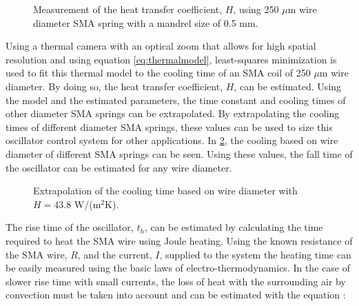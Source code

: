 \begin{figure}[ht] %
  \centering
  \resizebox{0.8\textwidth}{!}{}
  \caption{Measurement of the heat transfer coefficient, $H$, using 250 $\mu$m wire diameter SMA spring with a mandrel size of 0.5 mm.}
  \label{fig:thermal-fitting}
\end{figure}

Using a thermal camera with an optical zoom that allows for high spatial resolution and using equation \ref{eq:thermalmodel}, least-squares minimization is used to fit this thermal model to the cooling time of an SMA coil of 250 $\mu$m wire diameter. By doing so, the heat transfer coefficient, $H$, can be estimated. Using the model and the estimated parameters, the time constant and cooling times of other diameter SMA springs can be extrapolated. By extrapolating the cooling times of different diameter SMA springs, these values can be used to size this oscillator control system for other applications. In \cref{fig:cooling-time-extrapolation}, the cooling based on wire diameter of different SMA springs can be seen. Using these values, the fall time of the oscillator can be estimated for any wire diameter.

\begin{figure}[ht] %
  \centering
  \resizebox{0.8\textwidth}{!}{}
  \caption{Extrapolation of the cooling time based on wire diameter with $H = 43.8$ W/(m$^2$K).}
  \label{fig:cooling-time-extrapolation}
\end{figure}

The rise time of the oscillator, $t_h$, can be estimated by calculating the time required to heat the SMA wire using Joule heating. Using the known resistance of the SMA wire, $R$, and the current, $I$, supplied to the system the heating time can be easily measured using the basic laws of electro-thermodynamics. In the case of slower rise time with small currents, the loss of heat with the surrounding air by convection must be taken into account and can be estimated with the equation :

